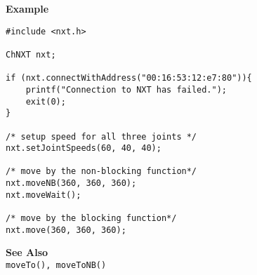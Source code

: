 \noindent
{\bf Example}
\begin{lstlisting}
#include <nxt.h> 

ChNXT nxt;

if (nxt.connectWithAddress("00:16:53:12:e7:80")){
    printf("Connection to NXT has failed.");
    exit(0);
}
 
/* setup speed for all three joints */
nxt.setJointSpeeds(60, 40, 40);

/* move by the non-blocking function*/
nxt.moveNB(360, 360, 360);
nxt.moveWait();

/* move by the blocking function*/
nxt.move(360, 360, 360);
\end{lstlisting}

\noindent
{\bf See Also}\\
{\tt moveTo(), moveToNB()}\\
